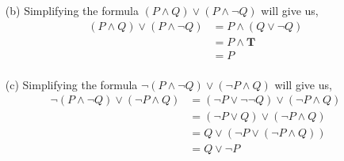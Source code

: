 \documentclass{article} %
\begin{document}
\begin{enumerate}
\begin{itemize}
        \item[(b)] Simplifying the formula $(P \land Q) \lor (P \land \neg Q)$ will give us,
        \begin{equation*} 
            \begin{split}
                (P \land Q) \lor (P \land \neg Q) & = P \land (Q \lor \neg Q) \\
                & = P \land \textbf{T} \\
                & = P \\
            \end{split}
        \end{equation*}

        \item[(c)] Simplifying the formula $\neg (P \land \neg Q) \lor (\neg P \land Q)$ will give us,
        \begin{equation*}
            \begin{split}
                \neg (P \land \neg Q) \lor (\neg P \land Q) & = (\neg P \lor \neg \neg Q) \lor (\neg P \land Q) \\
                & = (\neg P \lor Q) \lor (\neg P \land Q) \\
                & = Q \lor (\neg P \lor (\neg P \land Q)) \\
                & = Q \lor \neg P \\
            \end{split}
        \end{equation*}

    \end{itemize}


\end{enumerate}
\end{document}
